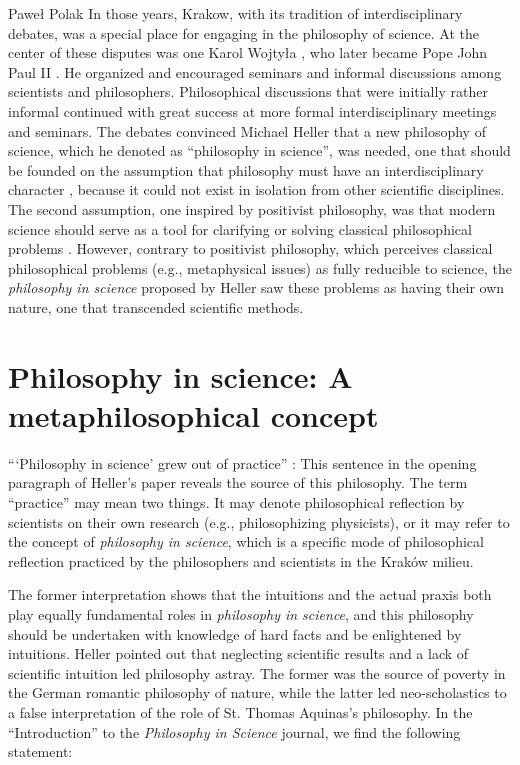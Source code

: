 \begin{artengenv}{Paweł Polak}
In those years, Krakow, with its tradition of interdisciplinary debates, was a special place for engaging in the
philosophy of science. At the center of these disputes was one Karol Wojtyła
\parencite[p.8nn]{pol_zycinski_kartki_1999},
who later became
Pope John Paul II . He organized and encouraged seminars and informal discussions among scientists and philosophers.
Philosophical discussions that were initially rather informal continued with great success at more formal
interdisciplinary meetings and seminars. The debates convinced Michael Heller that a new philosophy of science, which
he denoted as ``philosophy in science'', was needed, one that should be founded on the assumption that philosophy must
have an interdisciplinary character
\parencite[p.50]{pol_heller_poczatki_2006},
because it could not exist in isolation from other
scientific disciplines. The second assumption, one inspired by positivist philosophy, was that modern science should
serve as a tool for clarifying or solving classical philosophical problems
\parencite[p.50]{pol_heller_poczatki_2006}.
However,
contrary to positivist philosophy, which perceives classical philosophical problems (e.g., metaphysical issues) as
fully reducible to science, the \textit{philosophy in science }proposed by Heller saw these problems as having their
own nature, one that transcended scientific methods.

\section{Philosophy in science: A metaphilosophical concept}
``‘Philosophy in science’ grew out of practice''
\parencite[p.\pageref{heller-out-of}]{pol_heller_how_2019}:
This sentence in the opening paragraph of
Heller’s paper reveals the source of this philosophy. The term ``practice'' may mean two things. It may denote
philosophical reflection by scientists on their own research (e.g., philosophizing physicists), or it may refer to the
concept of \textit{philosophy in science}, which is a specific mode of philosophical reflection practiced by the
philosophers and scientists in the Kraków milieu. 

The former interpretation shows that the intuitions and the actual praxis both play equally fundamental roles in
\textit{philosophy in science}, and this philosophy should be undertaken with knowledge of hard facts and be
enlightened by intuitions. Heller
\parencite*[p.86]{pol_heller_philosophy_2011}
pointed out that neglecting scientific results and a lack of scientific
intuition led philosophy astray. The former was the source of poverty in the German romantic philosophy of nature,
while the latter led neo-scholastics to a false interpretation of the role of St. Thomas Aquinas’s philosophy. In the
``Introduction'' to the \textit{Philosophy in Science }journal, we find the following statement:


\end{artengenv}
